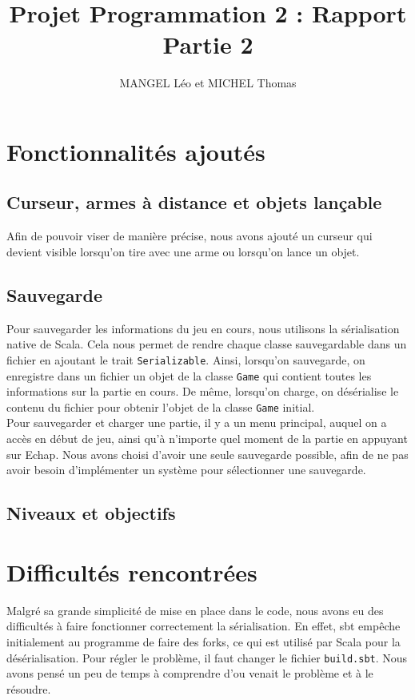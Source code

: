 \documentclass[10pt,a4paper]{article}
\title{Projet Programmation 2 : Rapport Partie 2}
\author{MANGEL Léo et MICHEL Thomas}
\date{}
\begin{document}
\maketitle

\section{Fonctionnalités ajoutés}

\subsection{Curseur, armes à distance et objets lançable}

Afin de pouvoir viser de manière précise, nous avons ajouté un curseur qui devient visible lorsqu'on tire avec une arme ou lorsqu'on lance un objet. 

\subsection{Sauvegarde}

Pour sauvegarder les informations du jeu en cours, nous utilisons la sérialisation native de Scala. Cela nous permet de rendre chaque classe sauvegardable dans un fichier en ajoutant le trait \texttt{Serializable}. Ainsi, lorsqu'on sauvegarde, on enregistre dans un fichier un objet de la classe \texttt{Game} qui contient toutes les informations sur la partie en cours. De même, lorsqu'on charge, on désérialise le contenu du fichier pour obtenir l'objet de la classe \texttt{Game} initial.\\
Pour sauvegarder et charger une partie, il y a un menu principal, auquel on a accès en début de jeu, ainsi qu'à n'importe quel moment de la partie en appuyant sur Echap. Nous avons choisi d'avoir une seule sauvegarde possible, afin de ne pas avoir besoin d'implémenter un système pour sélectionner une sauvegarde.\\

\subsection{Niveaux et objectifs}

\section{Difficultés rencontrées}

Malgré sa grande simplicité de mise en place dans le code, nous avons eu des difficultés à faire fonctionner correctement la sérialisation. En effet, sbt empêche initialement au programme de faire des forks, ce qui est utilisé par Scala pour la désérialisation. Pour régler le problème, il faut changer le fichier \texttt{build.sbt}. Nous avons pensé un peu de temps à comprendre d'ou venait le problème et à le résoudre.\\
\end{document}
